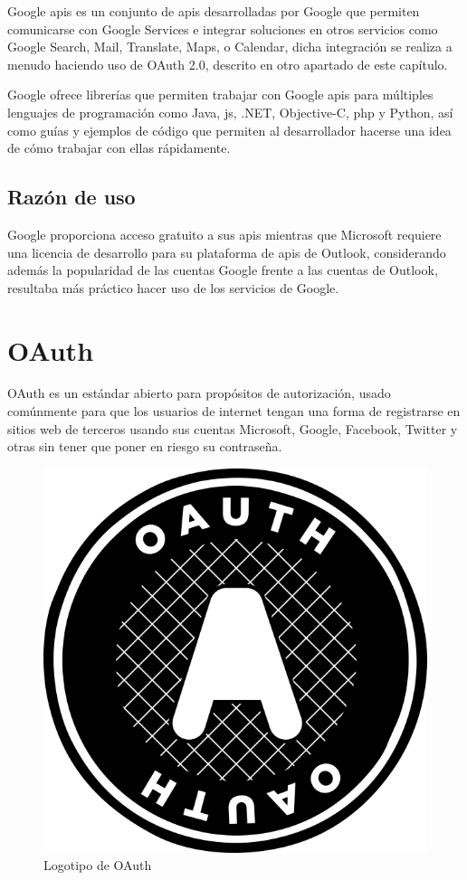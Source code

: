 Google \acrshort{api}s\cite{GoogleAPIs} es un conjunto de \acrshort{api}s desarrolladas por Google que permiten comunicarse con Google Services e integrar soluciones en otros servicios como Google Search, Mail, Translate, Maps, o Calendar, dicha integración se realiza a menudo haciendo uso de OAuth 2.0, descrito en otro apartado de este capítulo.

Google ofrece librerías que permiten trabajar con Google \acrshort{api}s para múltiples lenguajes de programación como Java, \acrfull{js}, .NET, Objective-C, \acrshort{php} y Python, así como guías y ejemplos de código que permiten al desarrollador hacerse una idea de cómo trabajar con ellas rápidamente.

\subsection{Razón de uso}

Google proporciona acceso gratuito a sus \acrshort{api}s mientras que Microsoft requiere una licencia de desarrollo para su plataforma de \acrshort{api}s de Outlook, considerando además la popularidad de las cuentas Google frente a las cuentas de Outlook, resultaba más práctico hacer uso de los servicios de Google.

\section{OAuth}

OAuth\cite{OAuth} es un estándar abierto para propósitos de autorización, usado comúnmente para que los usuarios de internet tengan una forma de registrarse en sitios web de terceros usando sus cuentas Microsoft, Google, Facebook, Twitter y otras sin tener que poner en riesgo su contraseña.

\begin{figure}[!htbp]
	\centering
	\includegraphics[scale=0.35]{fig/oauth_logo}
	\caption{Logotipo de OAuth}
\end{figure}

